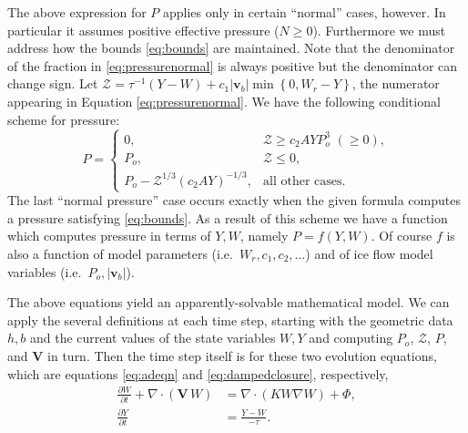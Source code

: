 \documentclass[12pt,final]{amsart}%
\newcommand\bv{\mathbf{v}}
\newcommand\bV{\mathbf{V}}
\newcommand{\Div}{\nabla\cdot}
\newcommand{\grad}{\nabla}
\begin{document}
The above expression for $P$ applies only in certain ``normal'' cases, however.  In particular it assumes positive effective pressure ($N\ge 0$).  Furthermore we must address how the bounds \eqref{eq:bounds} are maintained.  Note that the denominator of the fraction in \eqref{eq:pressurenormal} is always positive but the denominator can change sign.  Let $\mathcal{Z} = \tau^{-1} (Y-W) + c_1 |\bv_b| \min\left\{0,W_r - Y\right\}$,  the numerator appearing in Equation \eqref{eq:pressurenormal}.  We have the following conditional scheme for pressure:
\begin{equation}
P = \begin{cases}
0, & \mathcal{Z} \ge c_2 A Y P_o^3\,\, (\ge 0) , \\
P_o, & \mathcal{Z} \le 0, \\
P_o - \mathcal{Z}^{1/3} (c_2 A Y)^{-1/3}, & \text{all other cases}.
\end{cases} \label{eq:pressureWY}
\end{equation}
The last ``normal pressure'' case occurs exactly when the given formula computes a pressure satisfying \eqref{eq:bounds}.  As a result of this scheme we have a function which computes pressure in terms of $Y,W$, namely $P = f(Y,W)$.  Of course $f$ is also a function of model parameters (i.e.~$W_r,c_1,c_2,\dots$) and of ice flow model variables (i.e.~$P_o,|\bv_b|$).

The above equations yield an apparently-solvable mathematical model.  We can apply the several definitions at each time step, starting with the geometric data $h,b$ and the current values of the state variables $W,Y$ and computing $P_o$, $\mathcal{Z}$, $P$, and $\bV$ in turn.  Then the time step itself is for these two evolution equations, which are equations \eqref{eq:adeqn} and \eqref{eq:dampedclosure}, respectively,
\begin{align}
\frac{\partial W}{\partial t} + \Div\left(\bV\, W\right) &= \Div \left(K W \grad W\right) + \Phi, \label{eq:AGAINadeqn} \\
\frac{\partial Y}{\partial t} &= \frac{Y - W}{-\tau}. \label{eq:AGAINdampedclosure}
\end{align}
\end{document}
